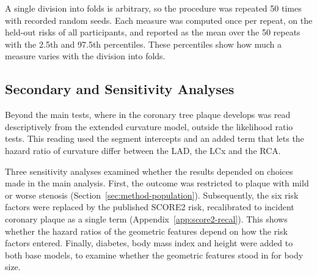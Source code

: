 A single division into folds is arbitrary, so the procedure was repeated 50 times with recorded random seeds.
Each measure was computed once per repeat, on the held-out risks of all participants, and reported as the mean over the 50 repeats with the 2.5th and 97.5th percentiles.
These percentiles show how much a measure varies with the division into folds.

\subsection{Secondary and Sensitivity Analyses}
\label{sec:method-sensitivity}

Beyond the main tests, where in the coronary tree plaque develops was read descriptively from the extended curvature model, outside the likelihood ratio tests.
This reading used the segment intercepts and an added term that lets the hazard ratio of curvature differ between the LAD, the LCx and the RCA.

Three sensitivity analyses examined whether the results depended on choices made in the main analysis.
First, the outcome was restricted to plaque with mild or worse stenosis (Section~\ref{sec:method-population}).
Subsequently, the six risk factors were replaced by the published SCORE2 risk, recalibrated to incident coronary plaque as a single term (Appendix~\ref{app:score2-recal}).
This shows whether the hazard ratios of the geometric features depend on how the risk factors entered.
Finally, diabetes, body mass index and height were added to both base models, to examine whether the geometric features stood in for body size.
